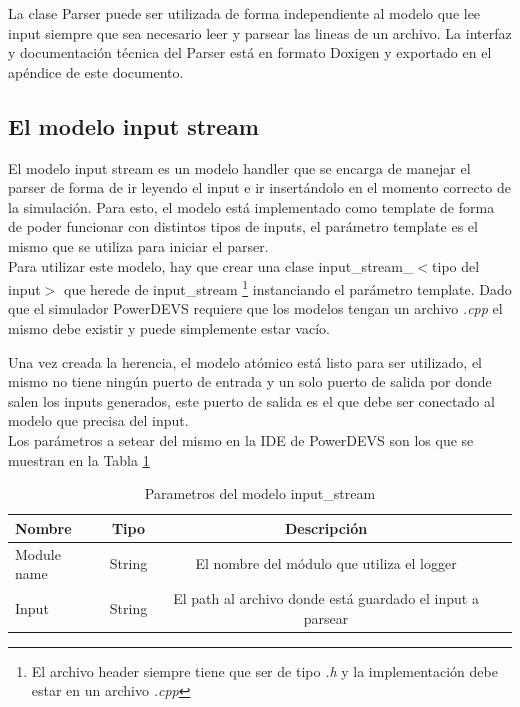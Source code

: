 \documentclass[10pt,a4paper]{article}
\begin{document}
La clase Parser puede ser utilizada de forma independiente al modelo que lee input siempre que sea necesario leer y parsear las lineas de un archivo. La interfaz y documentación técnica del Parser está en formato Doxigen y exportado en el apéndice de este documento.

\subsection{El modelo input stream}

El modelo input stream es un modelo handler que se encarga de manejar el parser de forma de ir leyendo el input e ir insertándolo en el momento correcto de la simulación. Para esto, el modelo está implementado como template de forma de poder funcionar con distintos tipos de inputs, el parámetro template es el mismo que se utiliza para iniciar el parser. \\

Para utilizar este modelo, hay que crear una clase input\_stream\_$<$tipo del input$>$ que herede de input\_stream \footnote{El archivo header siempre tiene que ser de tipo \textit{.h} y la implementación debe estar en un archivo \textit{.cpp}} instanciando el parámetro template. Dado que el simulador PowerDEVS requiere que los modelos tengan un archivo \textit{.cpp} el mismo debe existir y puede simplemente estar vacío.

Una vez creada la herencia, el modelo atómico está listo para ser utilizado, el mismo no tiene ningún puerto de entrada y un solo puerto de salida por donde salen los inputs generados, este puerto de salida es el que debe ser conectado al modelo que precisa del input. \\

Los parámetros a setear del mismo en la IDE de PowerDEVS son los que se muestran en la Tabla \ref{table: input stream parameters}
\begin{table}[h]
\begin{tabular}{|l|c|c|c|}
  \hline
  Nombre & Tipo & Descripción \\
  \hline
  Module name & String & El nombre del módulo que utiliza el logger \\
  \hline
  Input & String & El path al archivo donde está guardado el input a parsear \\
  \hline
\end{tabular}
\caption{Parametros del modelo input\_stream}
\label{table: input stream parameters}
\end{table}
\end{document}
